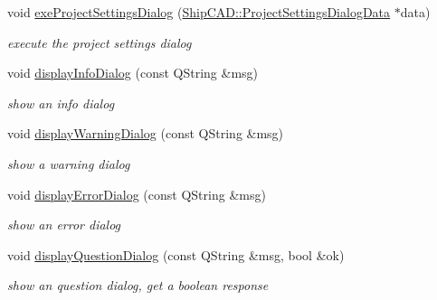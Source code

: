 \begin{DoxyCompactItemize}
void \hyperlink{classShipCAD_1_1Controller_a8b4484c9a2859c37170bd75a90676bb1}{exe\+Project\+Settings\+Dialog} (\hyperlink{structShipCAD_1_1ProjectSettingsDialogData}{Ship\+C\+A\+D\+::\+Project\+Settings\+Dialog\+Data} $\ast$data)
\begin{DoxyCompactList}\small\item\em execute the project settings dialog \end{DoxyCompactList}\item 
void \hyperlink{classShipCAD_1_1Controller_a5e3d8876bd01217eda54b73c06a42d47}{display\+Info\+Dialog} (const Q\+String \&msg)
\begin{DoxyCompactList}\small\item\em show an info dialog \end{DoxyCompactList}\item 
void \hyperlink{classShipCAD_1_1Controller_a108f5d44546cab9a8e58a7e8d187a68e}{display\+Warning\+Dialog} (const Q\+String \&msg)
\begin{DoxyCompactList}\small\item\em show a warning dialog \end{DoxyCompactList}\item 
void \hyperlink{classShipCAD_1_1Controller_a202940610fb5179281bc045b8e9f9925}{display\+Error\+Dialog} (const Q\+String \&msg)
\begin{DoxyCompactList}\small\item\em show an error dialog \end{DoxyCompactList}\item 
void \hyperlink{classShipCAD_1_1Controller_ae37d12b77bce8119a3562aba8e5b7ef0}{display\+Question\+Dialog} (const Q\+String \&msg, bool \&ok)
\begin{DoxyCompactList}\small\item\em show an question dialog, get a boolean response \end{DoxyCompactList}\end{DoxyCompactItemize}
